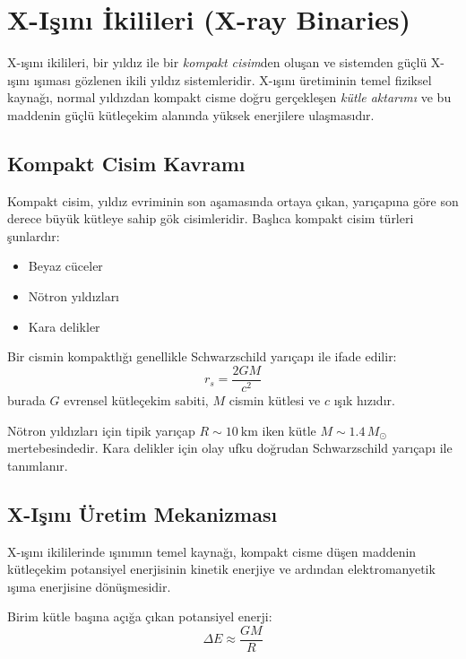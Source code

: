 \section{X-Işını İkilileri (X-ray Binaries)}

X-ışını ikilileri, bir yıldız ile bir \emph{kompakt cisim}den oluşan ve sistemden güçlü X-ışını ışıması gözlenen ikili yıldız sistemleridir. X-ışını üretiminin temel fiziksel kaynağı, normal yıldızdan kompakt cisme doğru gerçekleşen \emph{kütle aktarımı} ve bu maddenin güçlü kütleçekim alanında yüksek enerjilere ulaşmasıdır.

\subsection{Kompakt Cisim Kavramı}

Kompakt cisim, yıldız evriminin son aşamasında ortaya çıkan, yarıçapına göre son derece büyük kütleye sahip gök cisimleridir. Başlıca kompakt cisim türleri şunlardır:
\begin{itemize}
    \item Beyaz cüceler
    \item Nötron yıldızları
    \item Kara delikler
\end{itemize}

Bir cismin kompaktlığı genellikle Schwarzschild yarıçapı ile ifade edilir:
\begin{equation}
r_s = \frac{2GM}{c^2}
\end{equation}
burada $G$ evrensel kütleçekim sabiti, $M$ cismin kütlesi ve $c$ ışık hızıdır.

Nötron yıldızları için tipik yarıçap $R \sim 10\ \mathrm{km}$ iken kütle $M \sim 1.4\,M_\odot$ mertebesindedir. Kara delikler için olay ufku doğrudan Schwarzschild yarıçapı ile tanımlanır.

\subsection{X-Işını Üretim Mekanizması}

X-ışını ikililerinde ışınımın temel kaynağı, kompakt cisme düşen maddenin kütleçekim potansiyel enerjisinin kinetik enerjiye ve ardından elektromanyetik ışıma enerjisine dönüşmesidir.

Birim kütle başına açığa çıkan potansiyel enerji:
\begin{equation}
\Delta E \approx \frac{GM}{R}
\end{equation}

